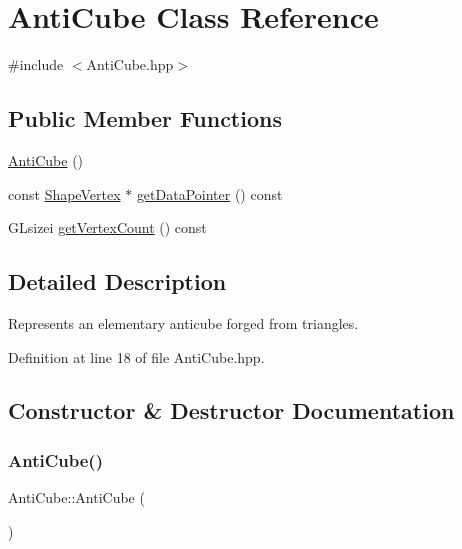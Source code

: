 \hypertarget{class_anti_cube}{}\section{Anti\+Cube Class Reference}
\label{class_anti_cube}


{\ttfamily \#include $<$Anti\+Cube.\+hpp$>$}

\subsection*{Public Member Functions}
\begin{DoxyCompactItemize}
\item 
\hyperlink{class_anti_cube_ab1b4dea7da48c30b54dcb38b81a39a4a}{Anti\+Cube} ()
\item 
const \hyperlink{structglimac_1_1_shape_vertex}{Shape\+Vertex} $\ast$ \hyperlink{class_anti_cube_a0e351dacff6b083fd5790b7d5e2d76bc}{get\+Data\+Pointer} () const
\item 
G\+Lsizei \hyperlink{class_anti_cube_aebdbeff8a01e37b90d448afe0a341b85}{get\+Vertex\+Count} () const
\end{DoxyCompactItemize}


\subsection{Detailed Description}
Represents an elementary anticube forged from triangles. 

Definition at line 18 of file Anti\+Cube.\+hpp.



\subsection{Constructor \& Destructor Documentation}
\mbox{\label{class_anti_cube_ab1b4dea7da48c30b54dcb38b81a39a4a}} 
\subsubsection{\texorpdfstring{Anti\+Cube()}{AntiCube()}}
{\footnotesize\ttfamily Anti\+Cube\+::\+Anti\+Cube (\begin{DoxyParamCaption}{ }\end{DoxyParamCaption})\hspace{0.3cm}{\ttfamily [inline]}}

